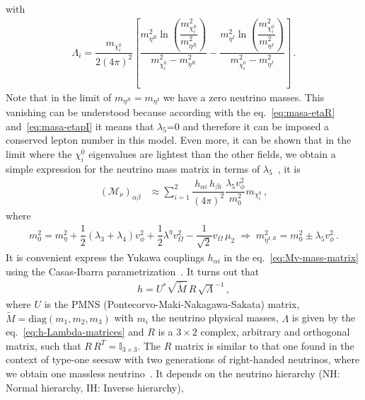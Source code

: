 \documentclass[12pt,letterpaper]{article}
\begin{document}
with
\begin{align}
\label{eq:Lambdai-definition}
\Lambda_i = \dfrac{m_{\chi_i^0}}{2(4\pi)^2}
\left[
\dfrac{m_{\eta^R}^2\ln\left(\dfrac{m_{\chi_i^0}^2}{m_{\eta^R}^2}\right)}{m_{\chi_i^0}^2-m_{\eta^R}^2}
-\dfrac{m_{\eta^I}^2\ln\left(\dfrac{m_{\chi_i^0}^2}{m_{\eta^I}^2}\right)}{m_{\chi_i^0}^2-m_{\eta^I}^2}
\right] \,.
\end{align}
Note that in the limit of $m_{\eta^R}= m_{\eta^I}$ we have a zero neutrino masses. This vanishing can be understood because according with the eq.~\ref{eq:masa-etaR} and~\ref{eq:masa-etapI} it means that $\lambda_5$=0 and therefore it can be imposed a conserved lepton number in this model. Even more, it can be shown that in the limit where the $\chi_i^0$ eigenvalues are lightest than the other fields, we obtain a simple expression for the neutrino mass matrix in terms of $\lambda_5$~\cite{Hirsch:2013ola}, it is
\begin{align}
\label{eq:Mv-aproximations}
(\mathcal{M}_\nu)_{\alpha\beta} &\approx \sum_{i=1}^2\dfrac{h_{\alpha i}\,h_{\beta i}}{(4\pi)^2}
\dfrac{\lambda_5 v_{\phi}^2}{m_0^2}
m_{\chi_i^0}\,,
\end{align}  
where 
\begin{align}
\label{ec_mo-definition}
m_0^2 = m_{\eta}^2 + \dfrac{1}{2}\left(\lambda_3+\lambda_4\right) v_{\phi}^2
+ \dfrac{1}{2}\lambda^{\eta}v_{\Omega}^2 - \dfrac{1}{\sqrt{2}}v_{\Omega}\,\mu_2\;
 \Rightarrow \;
 m_{\eta^{I,R}}^2 =m_0^2\pm\lambda_5 v_{\phi}^2\,.
\end{align}
It is convenient express the Yukawa couplings $h_{\alpha i}$ in the eq.~\ref{eq:Mv-mass-matrix} using the Casas-Ibarra parametrization~\cite{Casas:2001sr, Ibarra:2003up}. It turns out that
\begin{align}
h = U^*\sqrt{\widetilde{M}}\,R\,\sqrt{\Lambda}^{-1}\,, 
\end{align}
where $U$ is the PMNS (Pontecorvo-Maki-Nakagawa-Sakata) matrix, $\widetilde{M}=\text{diag}(m_1,m_2,m_3)$ with $m_i$ the neutrino physical masses, $\Lambda$ is given by the eq.~\ref{eq:h-Lambda-matrices} and $R$ is a $3\times 2$ complex, arbitrary and orthogonal matrix, such that $R\,R^T=\mathbb{I}_{3\times3}$. The $R$ matrix is similar to that one found in the context of type-one seesaw with two generations of right-handed neutrinos, where we obtain one massless neutrino~\cite{Ibarra:2003up}. It depends on the neutrino hierarchy (NH: Normal hierarchy, IH: Inverse hierarchy),
\end{document}
